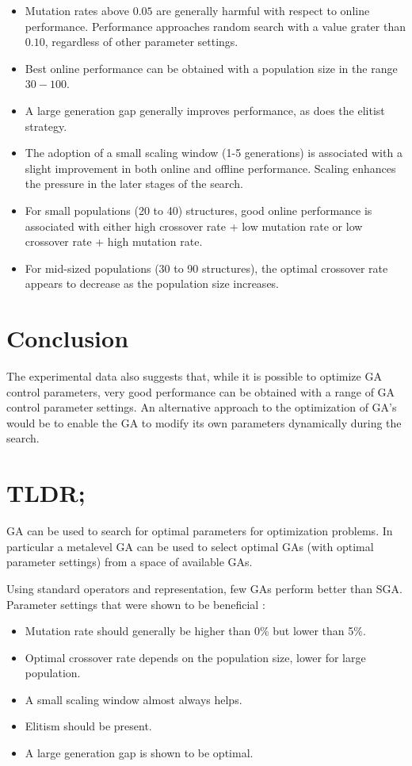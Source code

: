 \documentclass[../main.tex]{subfiles}
\begin{document}
\begin{itemize}
	\item Mutation rates above $0.05$ are generally harmful with respect to online performance. Performance approaches
	random search with a value grater than $0.10$, regardless of other parameter settings.
	\item Best online performance can be obtained with a population size in the range $30 - 100$.
	\item A large generation gap generally improves performance, as does the elitist strategy.
	\item The adoption of a small scaling window (1-5 generations) is associated with a slight improvement in both
	online and offline performance. Scaling enhances the pressure in the later stages of the search.
	\item For small populations (20 to 40) structures, good online performance is associated with either high crossover
	rate + low mutation rate or low crossover rate + high mutation rate.
	\item For mid-sized populations (30 to 90 structures), the optimal crossover rate appears to decrease as the
	population size increases.
\end{itemize}

\section{Conclusion}
The experimental data also suggests that, while it is possible to optimize GA control parameters, very good
performance can be obtained with a range of GA control parameter settings. An alternative approach to the optimization
of GA's would be to enable the GA to modify its own parameters dynamically
during the search.

\section{TLDR;}
GA can be used to search for optimal parameters for optimization problems. In particular a metalevel GA can be used to select optimal GAs (with optimal parameter settings) from a space of available GAs. 

Using standard operators and representation, few GAs perform better than SGA. Parameter settings that were shown to be beneficial : 
\begin{itemize}
\item Mutation rate should generally be higher than 0\% but lower than 5\%.
\item Optimal crossover rate depends on the population size, lower for large population.
\item A small scaling window almost always helps.
\item Elitism should be present.
\item A large generation gap is shown to be optimal.
\end{itemize}
\end{document}
